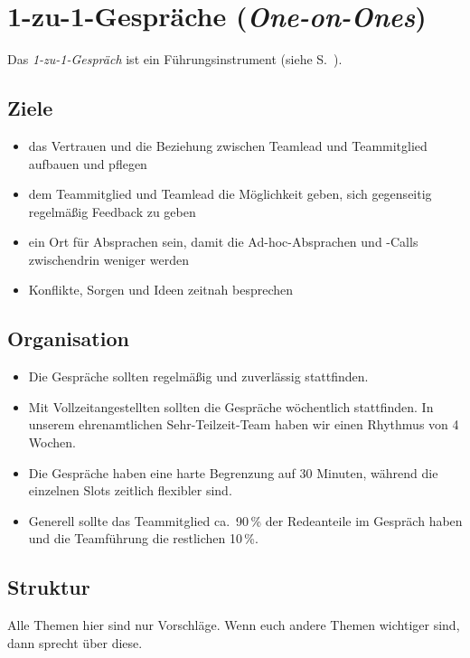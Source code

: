 \section{1-zu-1-Gespräche (\emph{One-on-Ones})}
\label{1-zu-1}

Das \emph{1-zu-1-Gespräch} ist ein Führungsinstrument (siehe S.~\pageref{fuehrungsinstrumente}).


\subsection{Ziele}

\begin{itemize}
 \item das Vertrauen und die Beziehung zwischen Teamlead und Teammitglied aufbauen und pflegen
 \item dem Teammitglied und Teamlead die Möglichkeit geben, sich gegenseitig regelmäßig Feedback zu geben
 \item ein Ort für Absprachen sein, damit die Ad-hoc-Absprachen und -Calls zwischendrin weniger werden
 \item Konflikte, Sorgen und Ideen zeitnah besprechen
\end{itemize}


\subsection{Organisation}

\begin{itemize}
 \item Die Gespräche sollten regelmäßig und zuverlässig stattfinden.
 \item Mit Vollzeitangestellten sollten die Gespräche wöchentlich stattfinden. In unserem ehrenamtlichen Sehr-Teilzeit-Team haben wir einen Rhythmus von 4 Wochen.
 \item Die Gespräche haben eine harte Begrenzung auf 30 Minuten, während die einzelnen Slots zeitlich flexibler sind.
 \item Generell sollte das Teammitglied ca.~90\,\% der Redeanteile im Gespräch haben und die Teamführung die restlichen 10\,\%.
\end{itemize}


\subsection{Struktur}

Alle Themen hier sind nur Vorschläge. Wenn euch andere Themen wichtiger sind, dann sprecht über diese.

